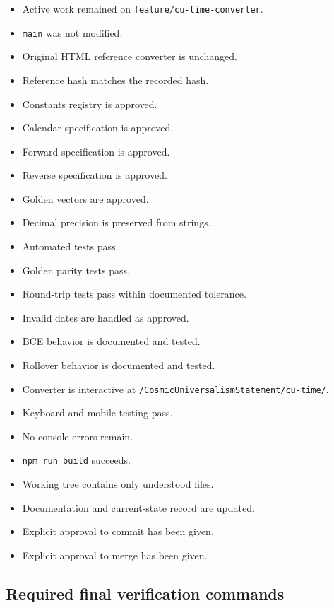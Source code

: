 \documentclass[11pt,letterpaper]{article}
\newcommand{\TargetRoute}{/CosmicUniversalismStatement/cu-time/}
\newcommand{\checkbox}{\(\square\)}
\newcommand{\branchname}[1]{\texttt{#1}}
\begin{document}
\begin{itemize}
    \item[\checkbox] Active work remained on \branchname{feature/cu-time-converter}.
    \item[\checkbox] \branchname{main} was not modified.
    \item[\checkbox] Original HTML reference converter is unchanged.
    \item[\checkbox] Reference hash matches the recorded hash.
    \item[\checkbox] Constants registry is approved.
    \item[\checkbox] Calendar specification is approved.
    \item[\checkbox] Forward specification is approved.
    \item[\checkbox] Reverse specification is approved.
    \item[\checkbox] Golden vectors are approved.
    \item[\checkbox] Decimal precision is preserved from strings.
    \item[\checkbox] Automated tests pass.
    \item[\checkbox] Golden parity tests pass.
    \item[\checkbox] Round-trip tests pass within documented tolerance.
    \item[\checkbox] Invalid dates are handled as approved.
    \item[\checkbox] BCE behavior is documented and tested.
    \item[\checkbox] Rollover behavior is documented and tested.
    \item[\checkbox] Converter is interactive at \texttt{\TargetRoute}.
    \item[\checkbox] Keyboard and mobile testing pass.
    \item[\checkbox] No console errors remain.
    \item[\checkbox] \texttt{npm run build} succeeds.
    \item[\checkbox] Working tree contains only understood files.
    \item[\checkbox] Documentation and current-state record are updated.
    \item[\checkbox] Explicit approval to commit has been given.
    \item[\checkbox] Explicit approval to merge has been given.
\end{itemize}

\subsection{Required final verification commands}
\end{document}
